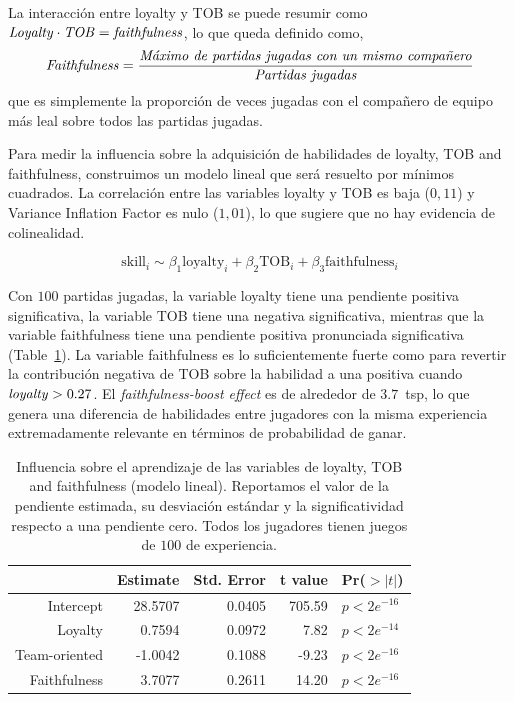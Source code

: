 \documentclass[a4paper,11pt]{book}
\theoremstyle{definition}
\begin{document}
La interacci\'on entre loyalty y TOB se puede resumir como $ \text{\emph{Loyalty}} \cdot \text{\emph{TOB}} = \text{\emph{faithfulness}}$, lo que queda definido como,
%
\begin{equation}
\text{\emph{Faithfulness}} = \frac{\text{\emph{M\'aximo de partidas jugadas con un mismo compa\~nero}}}{\text{\emph{Partidas jugadas}}}
\end{equation}
%
que es simplemente la proporci\'on de veces jugadas con el compa\~nero de equipo m\'as leal sobre todos las partidas jugadas.


Para medir la influencia sobre la adquisici\'on de habilidades de loyalty, TOB and faithfulness, construimos un modelo lineal que ser\'a resuelto por m\'inimos cuadrados.
%
La correlaci\'on entre las variables loyalty y TOB es baja ($0,11$) y Variance Inflation Factor es nulo ($1,01$), lo que sugiere que no hay evidencia de colinealidad.

\begin{equation}
\text{skill}_i \sim \beta_1\text{loyalty}_i + \beta_2\text{TOB}_i + \beta_3\text{faithfulness}_i
\end{equation}

Con $100$ partidas jugadas, la variable loyalty tiene una pendiente positiva significativa, la variable TOB tiene una negativa significativa, mientras que la variable faithfulness tiene una pendiente positiva pronunciada significativa (Table~\ref{model}).
%
La variable faithfulness es lo suficientemente fuerte como para revertir la contribuci\'on negativa de TOB sobre la habilidad a una positiva cuando $\text{\emph{loyalty}}>0.27$.
%
El \emph{faithfulness-boost effect} es de alrededor de $3.7$~tsp, lo que genera una diferencia de habilidades entre jugadores con la misma experiencia extremadamente relevante en t\'erminos de probabilidad de ganar.

\begin{table}[ht]
\centering
\begin{tabular}{rrrrl}
  \hline
 & Estimate & Std. Error & t value & Pr($>|t|$) \\
  \hline
Intercept & 28.5707 & 0.0405 & 705.59 & $p< 2e^{-16}$ \\
  Loyalty & 0.7594 & 0.0972 & 7.82 & $p< 2e^{-14}$ \\
  Team-oriented & -1.0042 & 0.1088 & -9.23 & $p< 2e^{-16}$ \\
  Faithfulness & 3.7077 & 0.2611 & 14.20 & $p< 2e^{-16}$ \\
   \hline
\end{tabular}
\caption{
Influencia sobre el aprendizaje de las variables de loyalty, TOB and faithfulness (modelo lineal). Reportamos el valor de la pendiente estimada, su desviaci\'on est\'andar y la significatividad respecto a una pendiente cero. Todos los jugadores tienen juegos de $100$ de experiencia.
}
\label{model}
\end{table}
\end{document}
